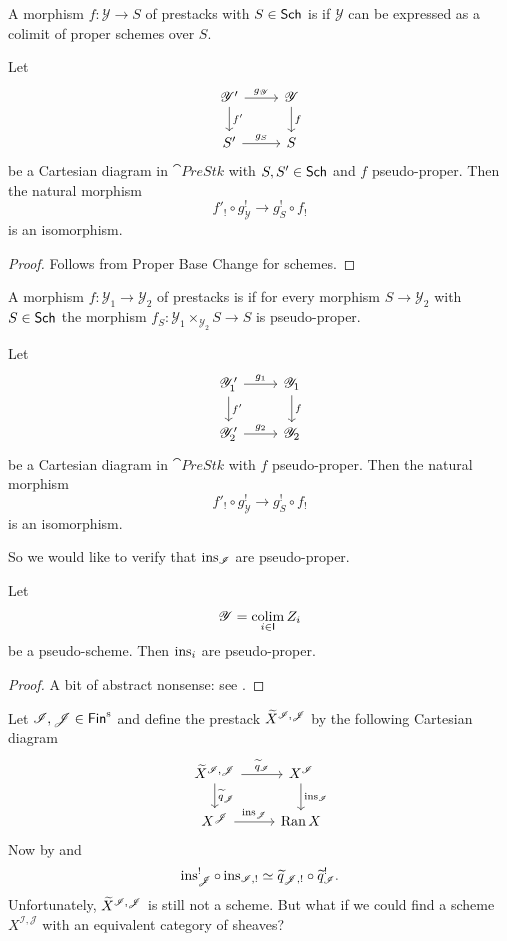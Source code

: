 \documentclass[oneside]{amsart}
\newcommand{\CI}{\mathcal{I}}
\newcommand{\PreStk}{\cat{PreStk}}
\newcommand{\CY}{\mathcal{Y}}
\newcommand{\CJ}{\mathcal{J}}
\begin{document}
\begin{definition}
	A morphism $f:\CY\to S$ of prestacks with $S\in \mathsf{Sch}$ is  if $\CY$ can be expressed as a colimit of proper schemes over $S$.
\end{definition}
\begin{proposition}
	Let
	\[
	\begin{tikzcd}
		\CY' \ar[r,"g_\CY"] \ar[d,"f'"] & \CY \ar[d,"f"] \\
		S' \ar[r,"g_S"] & S
	\end{tikzcd}
	\] 
	be a Cartesian diagram in $\PreStk$ with $S,S'\in \mathsf{Sch}$ and $f$ pseudo-proper. Then the natural morphism
	\[
	f'_!\circ g_\CY^{!} \to g_S^{!} \circ f_!
	\] 
	is an isomorphism.
\end{proposition}
\begin{proof}
	Follows from Proper Base Change for schemes.
\end{proof}
\begin{definition}
	A morphism $f:\CY_1\to \CY_2$ of prestacks is  if for every morphism $S\to \CY_2$ with $S\in \mathsf{Sch}$ the morphism $f_S:\CY_1\times_{\CY_2}S\to S$ is pseudo-proper.
\end{definition}
\begin{corollary}\label{cor:bc}
	Let
	\[
	\begin{tikzcd}
		\CY_1' \ar[r,"g_1"] \ar[d,"f'"] & \CY_1 \ar[d,"f"] \\
		\CY_2' \ar[r,"g_2"] & \CY_2
	\end{tikzcd}
	\] 
	be a Cartesian diagram in $\PreStk$ with $f$ pseudo-proper. Then the natural morphism
	\[
	f'_!\circ g_\CY^{!} \to g_S^{!} \circ f_!
	\] 
	is an isomorphism.
\end{corollary}

So we would like to verify that $\ins_\CI$ are pseudo-proper.
\begin{proposition}\label{prop:insp}
	Let
	\[
		\CY = \colim_{i\in \cat{I}}Z_i
	\] 
	be a pseudo-scheme. Then $\operatorname{ins}_i$ are pseudo-proper.
\end{proposition}
\begin{proof}
	A bit of abstract nonsense: see \cite[Proposition~7.4.2]{abott}.
\end{proof}

Let $\CI,\CJ\in \Fins$ and define the prestack $\wt{X}^{\CI,\CJ}$ by the following Cartesian diagram
\[
\begin{tikzcd}
	\wt{X}^{\CI,\CJ} \ar[r,"\wt{q}_{\CI}"] \ar[d,"\wt{q}_{\CJ}"] & X^{\CI} \ar[d,"\ins_{\CI}"] \\
	X^{\CJ} \ar[r,"\ins_{\CJ}"] & \Ran X
\end{tikzcd}
\] 
Now by  and 
\[
	\ins_\CJ^{!}\circ\ins_{\CI,!} \isoto \wt{q}_{\CJ,!}\circ \wt{q}_{\CI}^{!}.
\] 
Unfortunately, $\wt{X}^{\CI,\CJ}$ is still not a scheme. But what if we could find a scheme $X^{\CI,\CJ}$ with an equivalent category of sheaves?
\end{document}
